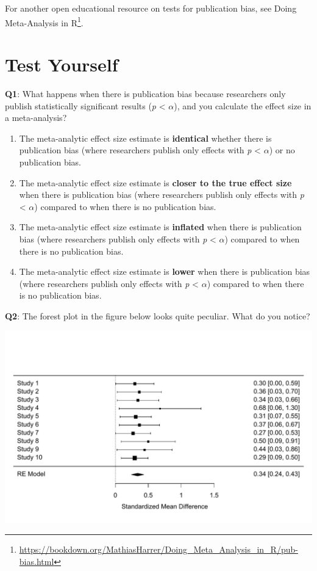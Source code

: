 \documentclass[
  oneside]{krantz}
\providecommand{\tightlist}{%
  \setlength{\itemsep}{0pt}\setlength{\parskip}{0pt}}
\renewcommand{\href}[2]{#2\footnote{\url{#1}}}
\begin{document}
For another open educational resource on tests for publication bias, see \href{https://bookdown.org/MathiasHarrer/Doing_Meta_Analysis_in_R/pub-bias.html}{Doing Meta-Analysis in R}.

\hypertarget{test-yourself-10}{%
\section{Test Yourself}\label{test-yourself-10}}

\textbf{Q1}: What happens when there is publication bias because researchers only publish statistically significant results (\emph{p} \textless{} \(\alpha\)), and you calculate the effect size in a meta-analysis?

\begin{enumerate}
\def\labelenumi{\Alph{enumi})}
\tightlist
\item
  The meta-analytic effect size estimate is \textbf{identical} whether there is publication bias (where researchers publish only effects with \emph{p} \textless{} \(\alpha\)) or no publication bias.
\item
  The meta-analytic effect size estimate is \textbf{closer to the true effect size} when there is publication bias (where researchers publish only effects with \emph{p} \textless{} \(\alpha\)) compared to when there is no publication bias.
\item
  The meta-analytic effect size estimate is \textbf{inflated} when there is publication bias (where researchers publish only effects with \emph{p} \textless{} \(\alpha\)) compared to when there is no publication bias.
\item
  The meta-analytic effect size estimate is \textbf{lower} when there is publication bias (where researchers publish only effects with \emph{p} \textless{} \(\alpha\)) compared to when there is no publication bias.
\end{enumerate}

\textbf{Q2}: The forest plot in the figure below looks quite peculiar. What do you notice?

\begin{center}\includegraphics[width=1\linewidth]{12-bias_files/figure-latex/metasimq2-1} \end{center}
\end{document}
